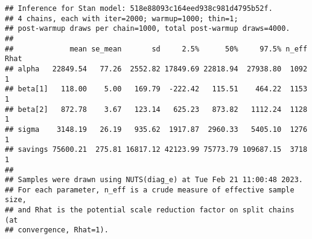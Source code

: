 \documentclass[
]{article}
\newenvironment{Shaded}{\begin{snugshade}}{\end{snugshade}}
\newcommand{\AttributeTok}[1]{\textcolor[rgb]{0.77,0.63,0.00}{#1}}
\newcommand{\DecValTok}[1]{\textcolor[rgb]{0.00,0.00,0.81}{#1}}
\newcommand{\FunctionTok}[1]{\textcolor[rgb]{0.00,0.00,0.00}{#1}}
\newcommand{\NormalTok}[1]{#1}
\newcommand{\OtherTok}[1]{\textcolor[rgb]{0.56,0.35,0.01}{#1}}
\newcommand{\SpecialCharTok}[1]{\textcolor[rgb]{0.00,0.00,0.00}{#1}}
\newcommand{\StringTok}[1]{\textcolor[rgb]{0.31,0.60,0.02}{#1}}
\begin{document}
\begin{Shaded}
\end{Shaded}

\begin{verbatim}
## Inference for Stan model: 518e88093c164eed938c981d4795b52f.
## 4 chains, each with iter=2000; warmup=1000; thin=1; 
## post-warmup draws per chain=1000, total post-warmup draws=4000.
## 
##             mean se_mean       sd     2.5%      50%     97.5% n_eff Rhat
## alpha   22849.54   77.26  2552.82 17849.69 22818.94  27938.80  1092    1
## beta[1]   118.00    5.00   169.79  -222.42   115.51    464.22  1153    1
## beta[2]   872.78    3.67   123.14   625.23   873.82   1112.24  1128    1
## sigma    3148.19   26.19   935.62  1917.87  2960.33   5405.10  1276    1
## savings 75600.21  275.81 16817.12 42123.99 75773.79 109687.15  3718    1
## 
## Samples were drawn using NUTS(diag_e) at Tue Feb 21 11:00:48 2023.
## For each parameter, n_eff is a crude measure of effective sample size,
## and Rhat is the potential scale reduction factor on split chains (at 
## convergence, Rhat=1).
\end{verbatim}
\end{document}
